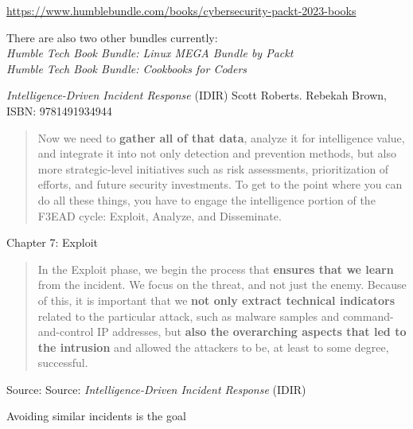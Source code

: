 \documentclass[Screen16to9,17pt]{foils}
\begin{document}
\begin{list2}
\item \url{https://www.humblebundle.com/books/cybersecurity-packt-2023-books}
\item There are also two other bundles currently:\\
\emph{Humble Tech Book Bundle: Linux MEGA Bundle by Packt}\\
\emph{Humble Tech Book Bundle: Cookbooks for Coders}
\end{list2}




\emph{Intelligence-Driven Incident Response} (IDIR)
 Scott Roberts. Rebekah Brown, ISBN: 9781491934944

\begin{quote}
Now we need to {\bf gather all of that data}, analyze it for intelligence value, and integrate it into not only detection and prevention methods, but also more strategic-level initiatives such as risk assessments, prioritization of efforts, and future security investments. To get to the point where you can do all these things, you have to engage the intelligence portion of the F3EAD cycle: Exploit, Analyze, and Disseminate.
\end{quote}

\begin{list2}
\item Chapter 7: Exploit
\end{list2}



\begin{quote}
In the Exploit phase, we begin the process that {\bf ensures that we learn} from the incident. We focus on the threat, and not just the enemy. Because of this, it is important that we {\bf not only extract technical indicators} related to the particular attack, such as malware samples and command-and-control IP addresses, but {\bf also the overarching aspects that led to the intrusion} and allowed the attackers to be, at least to some degree, successful.
\end{quote}
Source: Source: \emph{Intelligence-Driven Incident Response} (IDIR)

\begin{list2}
\item Avoiding similar incidents is the goal
\end{list2}
\end{document}
